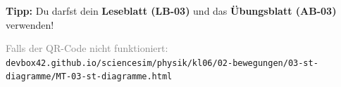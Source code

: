 \documentclass[11pt, a4paper]{article}
\begin{document}
\vspace{1.5em}


\begin{tcolorbox}[
    colback=white,
    colframe=physik,
    boxrule=1pt,
    arc=0pt
]
\textbf{Tipp:} Du darfst dein \textbf{Leseblatt (LB-03)} und das \textbf{Übungsblatt (AB-03)} verwenden!
\end{tcolorbox}

\vfill


\begin{center}
\textcolor{gray}{\small Falls der QR-Code nicht funktioniert:}\\[0.3em]
\texttt{\small devbox42.github.io/sciencesim/physik/kl06/02-bewegungen/03-st-diagramme/MT-03-st-diagramme.html}
\end{center}
\end{document}
